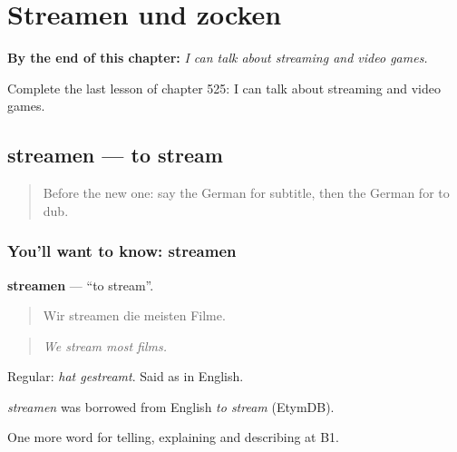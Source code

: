 
\chapter{Streamen und zocken}
\label{ch:ge-streamen-und-zocken}

\begin{chapteropening}
\textbf{By the end of this chapter:} \emph{I can talk about streaming and video games.}

Complete the last lesson of chapter 525: I can talk about streaming and video games.
\end{chapteropening}

\section[streamen]{streamen — to stream}

\label{lesson:GE-C525-streamen}



\begin{quote}
Before the new one: say the German for subtitle, then the German for to dub.
\end{quote}

\subsection*{You'll want to know: streamen}
\textbf{streamen} — \textquotedblleft{}to stream\textquotedblright{}.

\begin{quote}
Wir streamen die meisten Filme.
\end{quote}

\begin{quote}
\emph{We stream most films.}
\end{quote}

Regular: \emph{hat gestreamt}. Said as in English.

\begin{cousinweb}
\emph{streamen} was borrowed from English \emph{to stream} (EtymDB).
\end{cousinweb}

\begin{grammarlens}[title={What you've built}]
One more word for telling, explaining and describing at B1.
\end{grammarlens}

